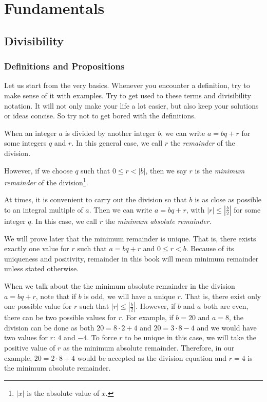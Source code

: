 \documentclass{subfile}
\begin{document}
	\part{Fundamentals}
	\chapter{Divisibility}\label{ch:divisibility}

	\section{Definitions and Propositions}
	Let us start from the very basics. Whenever you encounter a definition, try to make sense of it with examples. Try to get used to these terms and divisibility notation. It will not only make your life a lot easier, but also keep your solutions or ideas concise. So try not to get bored with the definitions\watermark.
	\begin{definition}\label{def:remainder}
		When an integer $a$ is divided by another integer $b$, we can write $a=bq+r$ for some integers $q$ and $r$. In this general case, we call $r$ the \textit{remainder} of the division.

		However, if we choose $q$ such that $0\leq r< |b|$, then we say $r$ is the \textit{minimum remainder} of the division\footnote{$|x|$ is the absolute value of $x$.}.

		At times, it is convenient to carry out the division so that $b$ is as close as possible to an integral multiple of $a$. Then we can write $a = bq + r$, with $|r| \leq |\frac{b}{2}|$ for some integer $q$.  In this case, we call $r$ the \textit{minimum absolute remainder}.
	\end{definition}

	\begin{note}[1]
		We will prove later that the minimum remainder is unique. That is, there exists exactly one value for $r$ such that $a=bq+r$ and $0 \leq r <b$. Because of its uniqueness and positivity, remainder in this book will mean minimum remainder unless stated otherwise.
	\end{note}

	\begin{note}[2]
		When we talk about the the minimum absolute remainder in the division $a=bq+r$, note that if $b$ is odd, we will have a unique $r$. That is, there exist only one possible value for $r$ such that $|r| \leq \left|\frac{b}{2}\right|$. However, if $b$ and $a$ both are even, there can be two possible values for $r$. For example, if $b=20$ and $a=8$, the division can be done as both $20=8\cdot2+4$ and $20=3\cdot8-4$ and we would have two values for $r$: $4$ and $-4$. To force $r$ to be unique in this case, we will take the positive value of $r$ as the minimum absolute remainder. Therefore, in our example, $20=2\cdot8+4$ would be accepted as the division equation and $r=4$ is the minimum absolute remainder.
	\end{note}
\end{document}
